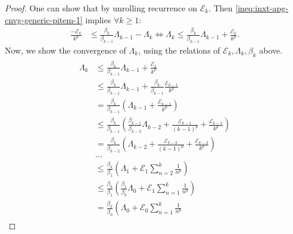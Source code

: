 \documentclass[12pt]{article}
\begin{document}
\begin{proof}
        One can show that by unrolling recurrence on $\mathcal E_k$. 
        Then \eqref{ineq:inxt-apg-cnvg-generic-pitem-1} implies $\forall k \ge 1$: 
        \begin{align}\label{ineq:inxt-apg-cnvg-generic-pitem-1}
            \frac{- \mathcal E_k}{k^p} &\le 
            \frac{\beta_k}{\beta_{k - 1}}\Lambda_{k - 1} - \Lambda_k
            \iff 
            \Lambda_k \le 
            \frac{\beta_k}{\beta_{k - 1}}\Lambda_{k - 1} + \frac{\mathcal E_k}{k^p}. 
        \end{align}
        Now, we show the convergence of $\Lambda_k$, using the relations of $\mathcal E_k, \Lambda_k, \beta_k$ above. 
        \begin{align*}\begin{split}
            \Lambda_k &\le 
            \frac{\beta_k}{\beta_{k - 1}}\Lambda_{k - 1} + \frac{\mathcal E_k}{k^p}
            \\
            &\le \frac{\beta_k}{\beta_{k - 1}}\Lambda_{k - 1} 
            + \frac{\beta_k}{\beta_{k -1}}\frac{\mathcal E_{k - 1}}{k^p}
            \\
            &= 
            \frac{\beta_k}{\beta_{k - 1}}
            \left(
                \Lambda_{k - 1} + \frac{\mathcal E_{k - 1}}{k^p}
            \right)
            \\
            &\le 
            \frac{\beta_k}{\beta_{k - 1}}
            \left(
                \frac{\beta_{k - 1}}{\beta_{k - 2}}\Lambda_{k - 2}
                + \frac{\mathcal E_{k - 1}}{(k - 1)^p}
                + \frac{\mathcal E_{k - 1}}{k^p}
            \right)
            \\
            &= 
            \frac{\beta_k}{\beta_{k - 2}}
            \left(
                \Lambda_{k - 2}
                + \frac{\mathcal E_{k - 2}}{(k - 1)^p}
                + \frac{\mathcal E_{k - 2}}{k^p}
            \right)
            \\
            & ...
            \\
            &\le \frac{\beta_k}{\beta_1}\left(
                \Lambda_1 + \mathcal E_1\sum_{n = 2}^{k} \frac{1}{n^p}
            \right)
            \\
            &\le \frac{\beta_k}{\beta_1}\left(
                \frac{\beta_1}{\beta_0}\Lambda_0 
                + \mathcal E_1\sum_{n = 1}^{k} \frac{1}{n^p}
            \right)
            \\
            &= \frac{\beta_k}{\beta_0}\left(
                \Lambda_0 
                + \mathcal E_0\sum_{n = 1}^{k} \frac{1}{n^p}

\end{split}
\end{align*}
\end{proof}
\end{document}
